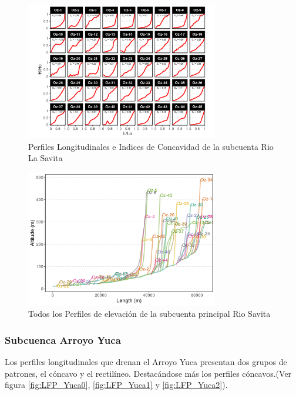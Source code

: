 \documentclass[11pt,]{article}
\begin{document}
\begin{figure}
\centering
\includegraphics[width=0.75000\textwidth]{Productos Generados/p_c_savita1.png}
\caption{\label{fig:LFP_Savita1} Perfiles Longitudinales e Indices de
Concavidad de la subcuenta Rio La Savita}
\end{figure}

\begin{figure}
\centering
\includegraphics[width=0.75000\textwidth]{Productos Generados/p_c_savita.png}
\caption{\label{fig:LFP_Savita2} Todos los Perfiles de elevación de la
subcuenta principal Rio Savita}
\end{figure}

\subsubsection{Subcuenca Arroyo Yuca}\label{subcuenca-arroyo-yuca}

Los perfiles longitudinales que drenan el Arroyo Yuca presentan dos
grupos de patrones, el cóncavo y el rectilíneo. Destacándose más los
perfiles cóncavos.(Ver figura \ref{fig:LFP_Yuca0}, \ref{fig:LFP_Yuca1} y
\ref{fig:LFP_Yuca2}).
\end{document}
